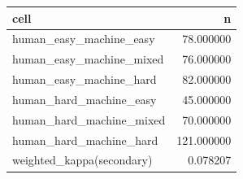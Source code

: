 \begin{tabular}{lr}
\toprule
cell & n \\
\midrule
human\_easy\_machine\_easy & 78.000000 \\
human\_easy\_machine\_mixed & 76.000000 \\
human\_easy\_machine\_hard & 82.000000 \\
human\_hard\_machine\_easy & 45.000000 \\
human\_hard\_machine\_mixed & 70.000000 \\
human\_hard\_machine\_hard & 121.000000 \\
weighted\_kappa(secondary) & 0.078207 \\
\bottomrule
\end{tabular}
